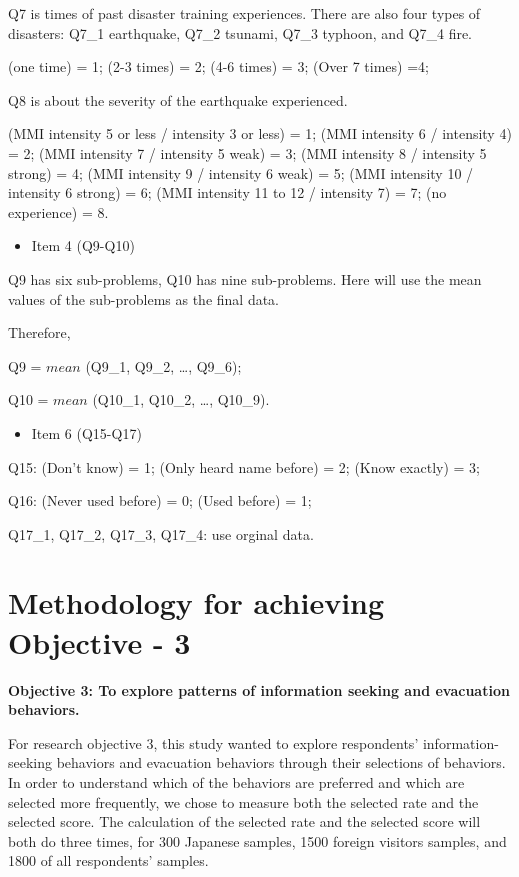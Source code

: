 Q7 is times of past disaster training experiences. There are also four types of disasters: Q7\_1 earthquake, Q7\_2 tsunami, Q7\_3 typhoon, and Q7\_4 fire.
 
(one time) = 1; (2-3 times) = 2; (4-6 times) = 3; (Over 7 times) =4;

Q8 is about the severity of the earthquake experienced.

(MMI intensity 5 or less / intensity 3 or less) = 1; (MMI intensity 6 / intensity 4) = 2; (MMI intensity 7 / intensity 5 weak) = 3; (MMI intensity 8 / intensity 5 strong) = 4; (MMI intensity 9 / intensity 6 weak) = 5; (MMI intensity 10 / intensity 6 strong) = 6; (MMI intensity 11 to 12 / intensity 7) = 7; (no experience) = 8.


\begin{itemize}
\item Item 4 (Q9-Q10)
\end{itemize}

Q9 has six sub-problems, Q10 has nine sub-problems. Here will use the mean values of the sub-problems as the final data. 

Therefore, 

Q9 = $mean$ (Q9\_1, Q9\_2, \dots, Q9\_6);

Q10 = $mean$ (Q10\_1, Q10\_2, \dots, Q10\_9).

\begin{itemize}
\item Item 6 (Q15-Q17)
\end{itemize}

Q15: (Don't know) = 1; (Only heard name before) = 2; (Know exactly) = 3;

Q16: (Never used before) = 0; (Used before) = 1;
 
Q17\_1, Q17\_2, Q17\_3, Q17\_4: use orginal data.


\section{Methodology for achieving Objective - 3}

\textbf{Objective 3: To explore patterns of information seeking and evacuation behaviors.}

For research objective 3, this study wanted to explore respondents' information-seeking behaviors and evacuation behaviors through their selections of behaviors. In order to understand which of the behaviors are preferred and which are selected more frequently, we chose to measure both the selected rate and the selected score. The calculation of the selected rate and the selected score will both do three times, for 300 Japanese samples, 1500 foreign visitors samples, and 1800 of all respondents' samples.


